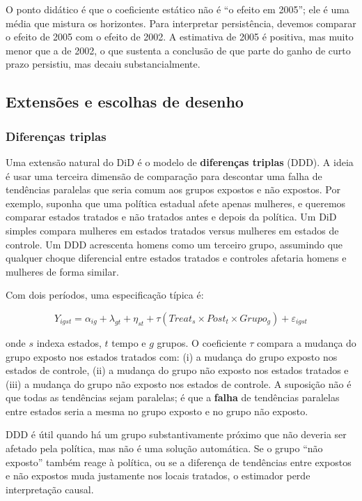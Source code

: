 \documentclass[
]{article}
\begin{document}
O ponto didático é que o coeficiente estático não é ``o efeito em 2005''; ele é uma média que mistura os horizontes. Para interpretar persistência, devemos comparar o efeito de 2005 com o efeito de 2002. A estimativa de 2005 é positiva, mas muito menor que a de 2002, o que sustenta a conclusão de que parte do ganho de curto prazo persistiu, mas decaiu substancialmente.

\subsection{Extensões e escolhas de desenho}\label{extensuxf5es-e-escolhas-de-desenho}

\subsubsection{Diferenças triplas}\label{diferenuxe7as-triplas}

Uma extensão natural do DiD é o modelo de \textbf{diferenças triplas} (DDD). A ideia é usar uma terceira dimensão de comparação para descontar uma falha de tendências paralelas que seria comum aos grupos expostos e não expostos. Por exemplo, suponha que uma política estadual afete apenas mulheres, e queremos comparar estados tratados e não tratados antes e depois da política. Um DiD simples compara mulheres em estados tratados versus mulheres em estados de controle. Um DDD acrescenta homens como um terceiro grupo, assumindo que qualquer choque diferencial entre estados tratados e controles afetaria homens e mulheres de forma similar.

Com dois períodos, uma especificação típica é:

\[
Y_{igst} = \alpha_{ig} + \lambda_{gt} + \eta_{st} + \tau (Treat_s \times Post_t \times Grupo_g) + \varepsilon_{igst}
\]

onde \(s\) indexa estados, \(t\) tempo e \(g\) grupos. O coeficiente \(\tau\) compara a mudança do grupo exposto nos estados tratados com: (i) a mudança do grupo exposto nos estados de controle, (ii) a mudança do grupo não exposto nos estados tratados e (iii) a mudança do grupo não exposto nos estados de controle. A suposição não é que todas as tendências sejam paralelas; é que a \textbf{falha} de tendências paralelas entre estados seria a mesma no grupo exposto e no grupo não exposto.

DDD é útil quando há um grupo substantivamente próximo que não deveria ser afetado pela política, mas não é uma solução automática. Se o grupo ``não exposto'' também reage à política, ou se a diferença de tendências entre expostos e não expostos muda justamente nos locais tratados, o estimador perde interpretação causal.
\end{document}
